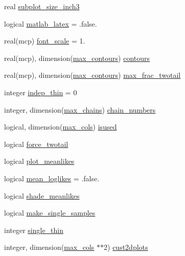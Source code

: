 \begin{DoxyCompactItemize}
\item 
real \mbox{\hyperlink{namespacemcsamples_ab97f8de1d5924a4908cb5b7953a30f16}{subplot\+\_\+size\+\_\+inch3}}
\item 
logical \mbox{\hyperlink{namespacemcsamples_acd85fa3b4250ca366e08576bd4df6bd8}{matlab\+\_\+latex}} = .false.
\item 
real(mcp) \mbox{\hyperlink{namespacemcsamples_ae4e5ef0996e111c2f91121884b99ccdc}{font\+\_\+scale}} = 1.
\item 
real(mcp), dimension(\mbox{\hyperlink{namespacemcsamples_a878ea2f4d47feda9ed7a1701aabfb0d1}{max\+\_\+contours}}) \mbox{\hyperlink{namespacemcsamples_ae745525f8fef6e02d22826cd2a5f1bcc}{contours}}
\item 
real(mcp), dimension(\mbox{\hyperlink{namespacemcsamples_a878ea2f4d47feda9ed7a1701aabfb0d1}{max\+\_\+contours}}) \mbox{\hyperlink{namespacemcsamples_a1db866dfd553051fc5cbd2c80bcd4c86}{max\+\_\+frac\+\_\+twotail}}
\item 
integer \mbox{\hyperlink{namespacemcsamples_a562ce4b67831be4911c45a4e08a6ef18}{indep\+\_\+thin}} = 0
\item 
integer, dimension(\mbox{\hyperlink{namespacemcsamples_a204c829ca43df2c6d41335156e6786ee}{max\+\_\+chains}}) \mbox{\hyperlink{namespacemcsamples_a619b6da70c38ede6a9851a3ee89b4019}{chain\+\_\+numbers}}
\item 
logical, dimension(\mbox{\hyperlink{namespacemcsamples_ae8386bad918d8af8d203683c01d5818c}{max\+\_\+cols}}) \mbox{\hyperlink{namespacemcsamples_a6269903cd9674bdcc7c4527acdddfef3}{isused}}
\item 
logical \mbox{\hyperlink{namespacemcsamples_a5bf85772fb62752a789a1d253bd6cd5a}{force\+\_\+twotail}}
\item 
logical \mbox{\hyperlink{namespacemcsamples_a68c0597751197a26086066ed961e47ef}{plot\+\_\+meanlikes}}
\item 
logical \mbox{\hyperlink{namespacemcsamples_a42f921b7349e79466c2128ebcb06e75f}{mean\+\_\+loglikes}} = .false.
\item 
logical \mbox{\hyperlink{namespacemcsamples_ad55967ca18b8319069920d6d1e772bb1}{shade\+\_\+meanlikes}}
\item 
logical \mbox{\hyperlink{namespacemcsamples_ad8e59e2a5de71cff7f1241b59b058291}{make\+\_\+single\+\_\+samples}}
\item 
integer \mbox{\hyperlink{namespacemcsamples_a39de2461adb48b31033a95a7d14666be}{single\+\_\+thin}}
\item 
integer, dimension(\mbox{\hyperlink{namespacemcsamples_ae8386bad918d8af8d203683c01d5818c}{max\+\_\+cols}} $\ast$$\ast$2) \mbox{\hyperlink{namespacemcsamples_a1831bdf8091941b6ccbd0c3fc3df90f9}{cust2dplots}}
$$
\end{DoxyCompactItemize}
